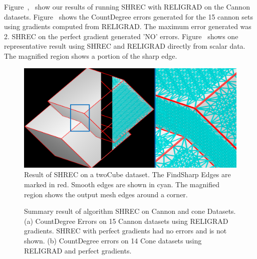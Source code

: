Figure~\protect{},~\protect{} show our results of running SHREC with RELIGRAD on the Cannon datasets. Figure~\protect{} shows the CountDegree errors generated for the 15 cannon sets using gradients computed from RELIGRAD. The maximum error generated was 2. SHREC on the perfect gradient generated 'NO' errors. Figure~\protect{} shows one representative result using SHREC and RELIGRAD directly from scalar data. The magnified region shows a portion of the sharp edge. 
\begin{figure}[tb]
	\includegraphics[width=\linewidth]{images/shrecperfect.eps}
	\caption{Result of SHREC on a twoCube dataset. The FindSharp Edges are marked in red. Smooth edges are shown in cyan. The magnified region shows the output mesh edges around a corner.}
	\label{fig:shrecPerfect1}
\end{figure}
\begin{figure}[tb]
	\caption{Summary result of algorithm SHREC on Cannon and cone Datasets. (a) CountDegree Errors on 15 Cannon datasets using RELIGRAD gradients. SHREC with perfect gradients had no errors and is not shown. (b) CountDegree errors on 14 Cone datasets using RELIGRAD and perfect gradients.}
	\label{fig:cannon_cone_summary}
\end{figure}
